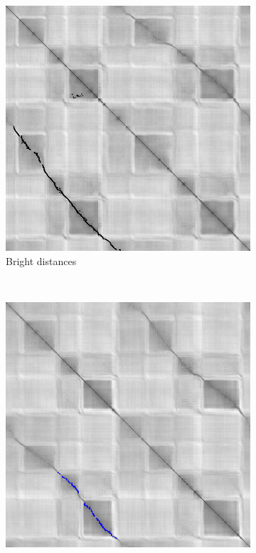 \documentclass[]{spie}  %
\begin{document}
\begin{figure}[!htb]
        \centering
        
        \begin{subfigure}[b]{0.27\textwidth}
        \centering
        \includegraphics[trim = 0mm 0mm 0mm 0mm, clip, width=\textwidth]{figures/dist_bright.png}    
        \caption{Bright distances}
        \label{subfig:dist_bright}
        \end{subfigure}
        ~ 
        \begin{subfigure}[b]{0.27\textwidth}
        \centering
        \includegraphics[trim = 0mm 0mm 0mm 0mm, clip, width=\textwidth]{figures/dist_dim.png}    

\end{subfigure}
\end{figure}
\end{document}
